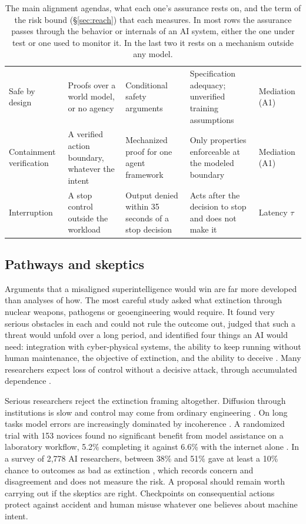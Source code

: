 \documentclass[10pt,twocolumn,letterpaper]{article}
\theoremstyle{definition}
\begin{document}
\begin{table}[t]
\begin{tabularx}{\textwidth}{@{}P{0.98in}P{1.18in}LLP{0.82in}@{}}
Safe by design \cite{dalrymple,scientist} & Proofs over a world model, or no agency & Conditional safety arguments & Specification adequacy; unverified training assumptions & Mediation (A1)\\
Containment verification \cite{moon,klein} & A verified action boundary, whatever the intent & Mechanized proof for one agent framework \cite{moon} & Only properties enforceable at the modeled boundary & Mediation (A1)\\
Interruption \cite{controlroom} & A stop control outside the workload & Output denied within 35 seconds of a stop decision & Acts after the decision to stop and does not make it & Latency $\tau$\\
\bottomrule
\end{tabularx}
\caption{The main alignment agendas, what each one's assurance rests on, and the term of the risk bound (\S\ref{sec:reach}) that each measures. In most rows the assurance passes through the behavior or internals of an AI system, either the one under test or one used to monitor it. In the last two it rests on a mechanism outside any model.}
\label{tab:agendas}
\end{table}

\subsection{Pathways and skeptics}

Arguments that a misaligned superintelligence would win are far more developed than analyses of how. The most careful study asked what extinction through nuclear weapons, pathogens or geoengineering would require. It found very serious obstacles in each and could not rule the outcome out, judged that such a threat would unfold over a long period, and identified four things an AI would need: integration with cyber-physical systems, the ability to keep running without human maintenance, the objective of extinction, and the ability to deceive \cite{rand}. Many researchers expect loss of control without a decisive attack, through accumulated dependence \cite{kulveit}.

Serious researchers reject the extinction framing altogether. Diffusion through institutions is slow and control may come from ordinary engineering \cite{normal}. On long tasks model errors are increasingly dominated by incoherence \cite{hotmess}. A randomized trial with 153 novices found no significant benefit from model assistance on a laboratory workflow, 5.2\% completing it against 6.6\% with the internet alone \cite{hong}. In a survey of 2,778 AI researchers, between 38\% and 51\% gave at least a 10\% chance to outcomes as bad as extinction \cite{grace}, which records concern and disagreement and does not measure the risk. A proposal should remain worth carrying out if the skeptics are right. Checkpoints on consequential actions protect against accident and human misuse whatever one believes about machine intent.
\end{document}
